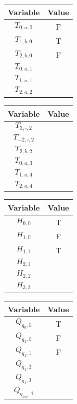\documentclass[10pt]{article}
\begin{document}
\begin{minipage}{0.22\textwidth}
	\begin{tabular}{c|c}
		Variable & Value\\
		\hline 
		$T_{0, a, 0}$ & F\\
		$T_{1, b, 0}$ & T\\
		$T_{2, b, 0}$ & F\\
		$T_{0, a, 1}$ & \\
		$T_{1, a, 1}$ & \\
		$T_{2, a, 2}$ & \\
	\end{tabular}
\end{minipage}
\begin{minipage}{0.22\textwidth}
	\begin{tabular}{c|c}
		Variable & Value\\
		\hline 
		$T_{3, \square, 2}$ & \\
		$T_{-2, \square, 2}$ & \\
		$T_{2, b, 2}$ & \\
		$T_{0, a, 3}$ & \\
		$T_{1, a, 4}$ & \\
		$T_{2, a, 4}$ & \\
	\end{tabular}
\end{minipage}
\begin{minipage}{0.22\textwidth}
	\begin{tabular}{c|c}
		Variable & Value\\
		\hline 
		$H_{0, 0}$ & T\\
		$H_{1, 0}$ & F\\
		$H_{1, 1}$ & T\\
		$H_{2, 1}$ & \\
		$H_{2, 2}$ & \\
		$H_{3, 3}$ & \\
	\end{tabular}
\end{minipage}
\begin{minipage}{0.22\textwidth}
	\begin{tabular}{c|c}
		Variable & Value\\
		\hline 
		$Q_{q_0, 0}$ & T\\
		$Q_{q_1, 0}$ & F\\
		$Q_{q_1, 1}$ & F\\
		$Q_{q_1, 2}$ & \\
		$Q_{q_1, 3}$ & \\
		$Q_{q_\text{acc}, 4}$ & \\
	\end{tabular}
\end{minipage}
\end{document}
